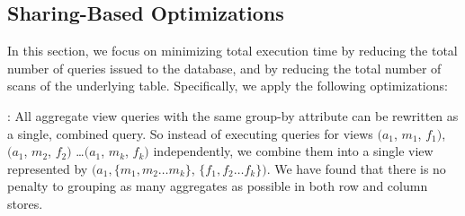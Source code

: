 

\subsection{Sharing-Based Optimizations}\label{sec:sharing-opt}
In this section, we focus on minimizing total execution time
by reducing the
total number of queries issued to the database,
and by reducing the total number of scans of the underlying table.
Specifically, we apply the following optimizations:

: All aggregate view queries 
with the same group-by attribute can be 
rewritten as a single, combined query. So instead of executing
queries for views $(a_1$, $m_1$, $f_1)$, $(a_1$, $m_2$, $f_2)$ \ldots $(a_1$, $m_k$, $f_k)$
independently, we combine them into a single view represented by
$(a_1, \{m_1, m_2\ldots m_k\}$, $\{f_1, f_2\ldots f_k\})$.  We have found that there is no penalty
to grouping as many aggregates as possible in both row and column stores. 

